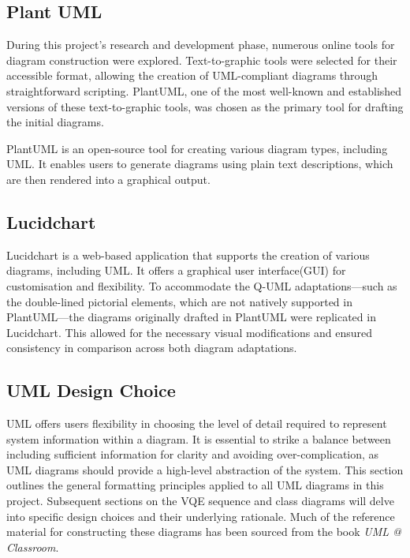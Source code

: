 \documentclass{article}
\begin{document}
\subsection{Plant UML}

During this project's research and development phase, numerous online tools for diagram construction were explored. Text-to-graphic tools were selected for their accessible format, allowing the creation of UML-compliant diagrams through straightforward scripting. PlantUML, one of the most well-known and established versions of these text-to-graphic tools, was chosen as the primary tool for drafting the initial diagrams.

PlantUML is an open-source tool for creating various diagram types, including UML. It enables users to generate diagrams using plain text descriptions, which are then rendered into a graphical output\cite{PUML}.

\subsection{Lucidchart}

Lucidchart is a web-based application that supports the creation of various diagrams, including UML. It offers a graphical user interface(GUI) for customisation and flexibility. To accommodate the Q-UML adaptations—such as the double-lined pictorial elements, which are not natively supported in PlantUML—the diagrams originally drafted in PlantUML were replicated in Lucidchart. This allowed for the necessary visual modifications and ensured consistency in comparison across both diagram adaptations.

\subsection{UML Design Choice}

UML offers users flexibility in choosing the level of detail required to represent system information within a diagram. It is essential to strike a balance between including sufficient information for clarity and avoiding over-complication, as UML diagrams should provide a high-level abstraction of the system. This section outlines the general formatting principles applied to all UML diagrams in this project. Subsequent sections on the VQE sequence and class diagrams will delve into specific design choices and their underlying rationale. Much of the reference material for constructing these diagrams has been sourced from the book \textit{UML @ Classroom}\cite{Seidl_Scholz_Huemer_Kappel_Duffy_2014}. 
\end{document}
